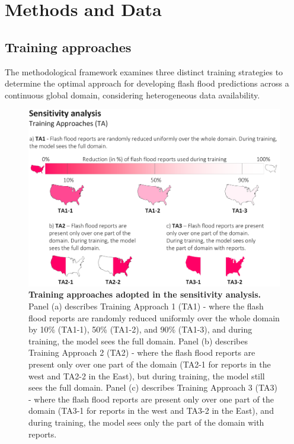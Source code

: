 

\section{Methods and Data}
\label{regional_to_global_training_methods_data}

\subsection{Training approaches}
The methodological framework examines three distinct training strategies to determine the optimal approach for developing flash flood predictions across a continuous global domain, considering heterogeneous data availability. 

\begin{figure}[htbp]
\centering
\includegraphics[width=\textwidth]{training_approaches.png}
\caption{\textbf{Training approaches adopted in the sensitivity analysis.} Panel (a) describes Training Approach 1 (TA1) - where the flash flood reports are randomly reduced uniformly over the whole domain by 10\% (TA1-1), 50\% (TA1-2), and 90\% (TA1-3), and during training, the model sees the full domain. Panel (b) describes Training Approach 2 (TA2) - where the flash flood reports are present only over one part of the domain (TA2-1 for reports in the west and TA2-2 in the East), but during training, the model still sees the full domain. Panel (c) describes Training Approach 3 (TA3) - where the flash flood reports are present only over one part of the domain (TA3-1 for reports in the west and TA3-2 in the East), and during training, the model sees only the part of the domain with reports.}
\label{fig:training_approaches}
\end{figure}

